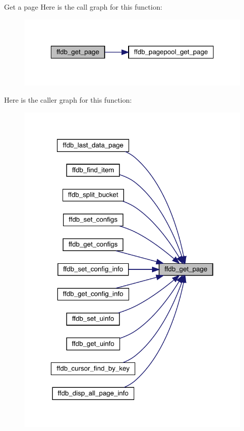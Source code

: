 Get a page Here is the call graph for this function\+:
\nopagebreak
\begin{figure}[H]
\begin{center}
\leavevmode
\includegraphics[width=322pt]{da/dc6/adat-devel_2other__libs_2filedb_2filehash_2ffdb__page_8c_a7a41e5d3aa641eaa3588ee323469147a_cgraph}
\end{center}
\end{figure}
Here is the caller graph for this function\+:
\nopagebreak
\begin{figure}[H]
\begin{center}
\leavevmode
\includegraphics[width=321pt]{da/dc6/adat-devel_2other__libs_2filedb_2filehash_2ffdb__page_8c_a7a41e5d3aa641eaa3588ee323469147a_icgraph}
\end{center}
\end{figure}
\mbox{\label{adat-devel_2other__libs_2filedb_2filehash_2ffdb__page_8c_a5376ee9beb2809fb31f0e5b5531ee91c}} 
